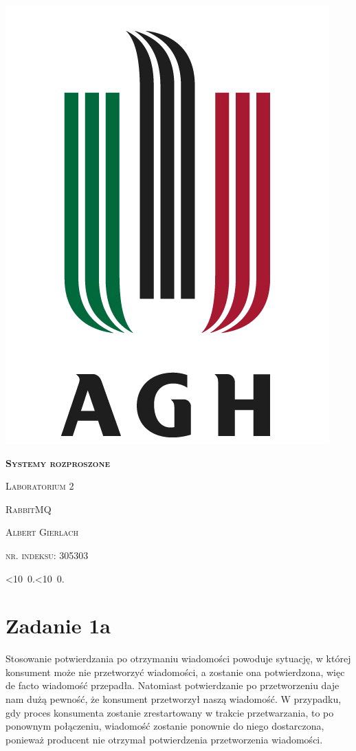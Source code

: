 \documentclass[12pt]{article}
\def\mydate{\leavevmode\hbox{\twodigits\day.\twodigits\month.\the\year}}
\def\twodigits#1{\ifnum#1<10 0\fi\the#1}
\begin{document}
\thispagestyle{empty}
\begin{center}
\begin{minipage}{0.75\linewidth}
    \centering
    \includegraphics[width=0.45\linewidth]{agh_logo2.png}
    \par
    \vspace{2cm}
    {\bfseries{\scshape{\Huge  Systemy rozproszone}}}
    \par
    \vspace{1.7cm}
    {\scshape{\Large Laboratorium 2}}
    \par
    \vspace{0.8cm}
    {\scshape{\Large RabbitMQ}}
    \par
    \vspace{3cm}

    {\scshape{\Large Albert Gierlach}}\par
    \vspace{0.6cm}
    {\scshape{\Large nr. indeksu: 305303}}\par
    \vspace{1cm}

    {\Large \mydate}
\end{minipage}
\end{center}
\clearpage



\section{Zadanie 1a}
Stosowanie potwierdzania po otrzymaniu wiadomości powoduje sytuację, w której konsument może nie przetworzyć wiadomości, a zostanie ona potwierdzona, więc de facto wiadomość przepadła. Natomiast potwierdzanie po przetworzeniu daje nam dużą pewność, że konsument przetworzył naszą wiadomość. W przypadku, gdy proces konsumenta zostanie zrestartowany w trakcie przetwarzania, to po ponownym połączeniu, wiadomość zostanie ponownie do niego dostarczona, ponieważ producent nie otrzymał potwierdzenia przetworzenia wiadomości.
\end{document}
